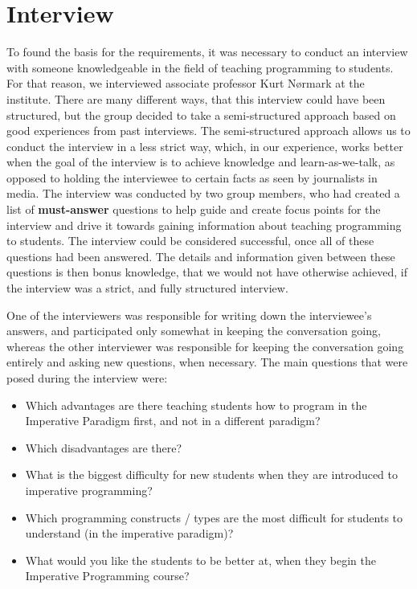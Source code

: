 \section{Interview}
\label{sec:interview}
To found the basis for the requirements, it was necessary to conduct an interview with someone knowledgeable in the field of teaching programming to 
students.
For that reason, we interviewed associate professor Kurt N{\o}rmark at the institute.
There are many different ways, that this interview could have been structured, but the group decided to take a semi-structured approach based on good experiences from past interviews.
The semi-structured approach allows us to conduct the interview in a less strict way, which, in our experience, works better when the goal of the interview is to achieve knowledge and learn-as-we-talk, as opposed to holding the interviewee to certain facts as seen by journalists in media.
The interview was conducted by two group members, who had created a list of \textbf{must-answer} questions to help guide and create focus points for the interview and drive it towards gaining information about teaching programming to students.
The interview could be considered successful, once all of these questions had been answered.
The details and information given between these questions is then bonus knowledge, that we would not have otherwise achieved, if the interview was a strict, and fully structured interview.\newline

One of the interviewers was responsible for writing down the interviewee's answers, and participated only somewhat in keeping the conversation going, whereas the other interviewer was responsible for keeping the conversation going entirely and asking new questions, when necessary. 
The main questions that were posed during the interview were:

\begin{itemize}
	\item Which advantages are there teaching students how to program in the Imperative Paradigm first, and not in a different paradigm?
	\item Which disadvantages are there?
	\item What is the biggest difficulty for new students when they are introduced to imperative programming?
	\item Which programming constructs / types are the most difficult for students to understand (in the imperative paradigm)?
	\item What would you like the students to be better at, when they begin the Imperative Programming course?
\end{itemize}

